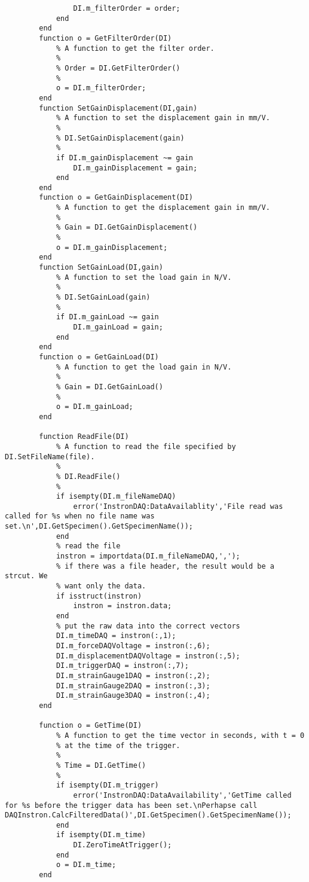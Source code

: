 \begin{lstlisting}
                DI.m_filterOrder = order;
            end
        end
        function o = GetFilterOrder(DI)
            % A function to get the filter order.
            %
            % Order = DI.GetFilterOrder()
            %
            o = DI.m_filterOrder;
        end
        function SetGainDisplacement(DI,gain)
            % A function to set the displacement gain in mm/V.
            %
            % DI.SetGainDisplacement(gain)
            %
            if DI.m_gainDisplacement ~= gain
                DI.m_gainDisplacement = gain;
            end
        end
        function o = GetGainDisplacement(DI)
            % A function to get the displacement gain in mm/V.
            %
            % Gain = DI.GetGainDisplacement()
            %
            o = DI.m_gainDisplacement;
        end
        function SetGainLoad(DI,gain)
            % A function to set the load gain in N/V.
            %
            % DI.SetGainLoad(gain)
            %
            if DI.m_gainLoad ~= gain
                DI.m_gainLoad = gain;
            end
        end
        function o = GetGainLoad(DI)
            % A function to get the load gain in N/V.
            %
            % Gain = DI.GetGainLoad()
            %
            o = DI.m_gainLoad;
        end
        
        function ReadFile(DI)
            % A function to read the file specified by DI.SetFileName(file).
            %
            % DI.ReadFile()
            %
            if isempty(DI.m_fileNameDAQ)
                error('InstronDAQ:DataAvailablity','File read was called for %s when no file name was set.\n',DI.GetSpecimen().GetSpecimenName());
            end
            % read the file
            instron = importdata(DI.m_fileNameDAQ,',');
            % if there was a file header, the result would be a strcut. We
            % want only the data.
            if isstruct(instron)
                instron = instron.data;
            end
            % put the raw data into the correct vectors
            DI.m_timeDAQ = instron(:,1);
            DI.m_forceDAQVoltage = instron(:,6);
            DI.m_displacementDAQVoltage = instron(:,5);
            DI.m_triggerDAQ = instron(:,7);
            DI.m_strainGauge1DAQ = instron(:,2);
            DI.m_strainGauge2DAQ = instron(:,3);
            DI.m_strainGauge3DAQ = instron(:,4);
        end

        function o = GetTime(DI)
            % A function to get the time vector in seconds, with t = 0
            % at the time of the trigger.
            %
            % Time = DI.GetTime()
            %
            if isempty(DI.m_trigger)
                error('InstronDAQ:DataAvailability','GetTime called for %s before the trigger data has been set.\nPerhapse call DAQInstron.CalcFilteredData()',DI.GetSpecimen().GetSpecimenName());
            end
            if isempty(DI.m_time)
                DI.ZeroTimeAtTrigger();
            end
            o = DI.m_time;
        end
        

\end{lstlisting}
